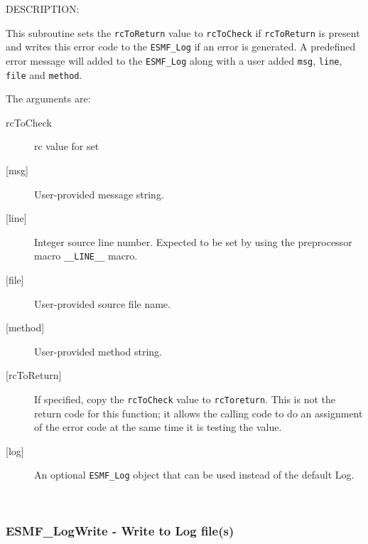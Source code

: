 {\sf DESCRIPTION:\\ }


        This subroutine sets the {\tt rcToReturn} value to {\tt rcToCheck} if
        {\tt rcToReturn} is present and writes this error code to the {\tt ESMF\_Log}
        if an error is generated.  A predefined error message will added to the
        {\tt ESMF\_Log} along with a user added {\tt msg}, {\tt line}, {\tt file}
        and {\tt method}.
  
        The arguments are:
        \begin{description}
  
        \item [rcToCheck]
              rc value for set
        \item [{[msg]}]
              User-provided message string.
        \item [{[line]}]
              Integer source line number.  Expected to be set by
              using the preprocessor macro {\tt \_\_LINE\_\_} macro.
        \item [{[file]}]
              User-provided source file name.
        \item [{[method]}]
              User-provided method string.
        \item [{[rcToReturn]}]
              If specified, copy the {\tt rcToCheck} value to {\tt rcToreturn}.
              This is not the return code for this function; it allows
              the calling code to do an assignment of the error code
              at the same time it is testing the value.
        \item [{[log]}]
              An optional {\tt ESMF\_Log} object that can be used instead
              of the default Log.
  
        \end{description}
   
 
\mbox{}\hrulefill\ 
 
\subsubsection [ESMF\_LogWrite] {ESMF\_LogWrite - Write to Log file(s)}



